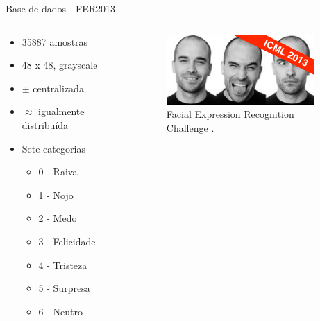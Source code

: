 \begin{frame}{Base de dados - FER2013}
    
\begin{columns}
    \begin{column}{0.5\textwidth}
      \begin{itemize}
            \item 35887 amostras
            \item 48 x 48, grayscale
            \item $\pm$ centralizada
            \item $\approx$ igualmente distribuída
            \item Sete categorias
                \begin{itemize}
                    \item 0 - Raiva
                    \item 1 - Nojo
                    \item 2 - Medo
                    \item 3 - Felicidade
                    \item 4 - Tristeza
                    \item 5 - Surpresa
                    \item 6 - Neutro
                \end{itemize}
        \end{itemize}
    \end{column}
    
    \begin{column}{0.6\textwidth}
          \begin{figure}
            \centering
            \includegraphics[width=0.7\linewidth]{img/front_page.png}
            \caption{Facial Expression Recognition Challenge \cite{carrier_courville}.}
          \end{figure}
    \end{column}
    
\end{columns} 
    
\end{frame}

